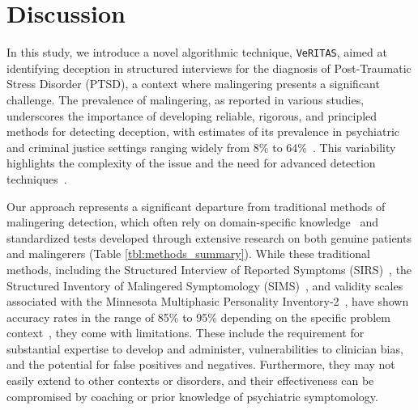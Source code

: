 \documentclass[onecolumn,10pt]{IEEEtran}
\def\vrts{\texttt{VeRITAS}\xspace}
\begin{document}
\section*{Discussion}
In this study, we introduce a novel algorithmic technique, \vrts, aimed at identifying deception in structured interviews for the diagnosis of Post-Traumatic Stress Disorder (PTSD), a context where malingering presents a significant challenge. The prevalence of malingering, as reported in various studies, underscores the importance of developing reliable, rigorous, and principled methods for detecting deception, with estimates of its prevalence in psychiatric and criminal justice settings ranging widely from 8\% to 64\%~\cite{mcdermott2013malingering,schmidt2020base,matto2019systematic}. This variability highlights the complexity of the issue and the need for advanced detection techniques~\cite{DePaulo2003}.

Our approach represents a significant departure from traditional methods of malingering detection, which often rely on domain-specific knowledge~\cite{walczyk2018review} and standardized tests developed through extensive research on both genuine patients and malingerers (Table \ref{tbl:methods_summary}). While these traditional methods, including the Structured Interview of Reported Symptoms (SIRS)~\cite{Wong2005}, the Structured Inventory of Malingered Symptomology (SIMS)~\cite{smith1997detection}, and validity scales associated with the Minnesota Multiphasic Personality Inventory-2~\cite{ben2012interpreting}, have shown accuracy rates in the range of 85\% to 95\% depending on the specific problem context~\cite{rogers2008determinations,sartori2008accurately,gregg2007vying,monaro2017detection}, they come with limitations. These include the requirement for substantial expertise to develop and administer, vulnerabilities to clinician bias, and the potential for false positives and negatives. Furthermore, they may not easily extend to other contexts or disorders, and their effectiveness can be compromised by coaching or prior knowledge of psychiatric symptomology.
\end{document}
